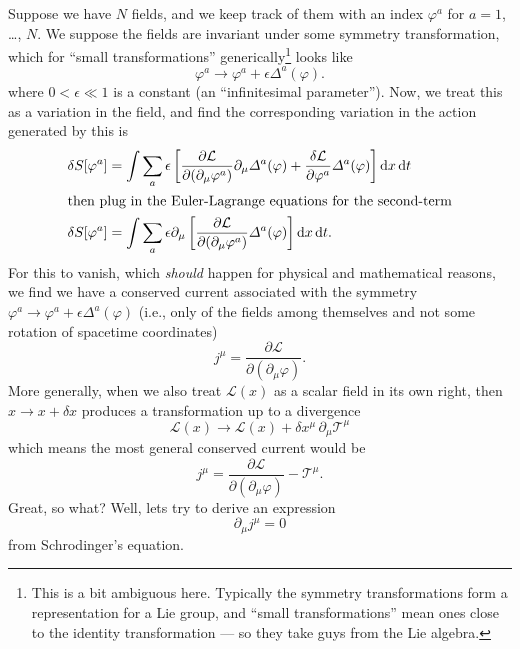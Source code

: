 \label{subsec:schrodinger:symmetry}
Suppose we have $N$ fields, and we keep track of them with an index
$\varphi^{a}$ for $a=1$, \dots, $N$. We suppose the fields are invariant
under some symmetry transformation, which for ``small transformations''
generically\footnote{This is a bit ambiguous here. Typically the
  symmetry transformations form a representation for a Lie group, and ``small transformations'' mean ones close to the identity transformation --- so they take guys from the Lie algebra.} looks like
\begin{equation}
\varphi^{a}\to\varphi^{a}+\epsilon\varDelta^{a}(\varphi).
\end{equation}
where $0<\epsilon\ll1$ is a constant (an ``infinitesimal parameter'').
Now, we treat this as a variation in the field, and find the
corresponding variation in the action generated by this is
\begin{subequations}
\begin{align}
\delta S[\varphi^{a}]
&=\int\sum_{a}\epsilon\left[\frac{\partial\mathcal{L}}{\partial(\partial_{\mu}\varphi^{a})}
\partial_{\mu}\varDelta^{a}(\varphi)
+\frac{\delta\mathcal{L}}{\partial\varphi^{a}}\varDelta^{a}(\varphi)\right]\mathrm{d} x\,\mathrm{d} t\\
\intertext{then plug in the Euler-Lagrange equations for the second-term}
\delta S[\varphi^{a}]&=\int\sum_{a}\epsilon\partial_{\mu}\left[
\frac{\partial\mathcal{L}}{\partial(\partial_{\mu}\varphi^{a})}\varDelta^{a}(\varphi)\right]\mathrm{d} x\,\mathrm{d} t.
\end{align}
\end{subequations}
For this to vanish, which \emph{should} happen for physical and mathematical
reasons, we find we have a conserved current associated with the
symmetry $\varphi^{a}\to\varphi^{a}+\epsilon\varDelta^{a}(\varphi)$
(i.e., only of the fields among themselves and not some rotation of
spacetime coordinates)
\begin{equation}
j^{\mu}=\frac{\partial\mathcal{L}}{\partial(\partial_{\mu}\varphi)}.
\end{equation}
More generally, when we also treat $\mathcal{L}(x)$ as a scalar field in
its own right, then $x\to x+\delta x$ produces a transformation up to a
divergence
\begin{equation}
\mathcal{L}(x)\to\mathcal{L}(x)+\delta x^{\mu}\,\partial_{\mu}\mathcal{T}^{\mu}
\end{equation}
which means the most general conserved current would be
\begin{equation}
j^{\mu}=\frac{\partial\mathcal{L}}{\partial(\partial_{\mu}\varphi)}-\mathcal{T}^{\mu}.
\end{equation}
Great, so what? Well, lets try to derive an expression
\begin{equation}
\partial_{\mu}j^{\mu}=0
\end{equation}
from Schrodinger's equation.

